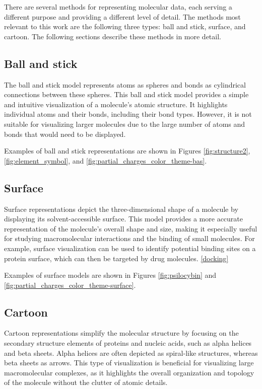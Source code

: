 \documentclass[
  digital,     %
  oneside,     %
  nosansbold,  %
  nocolorbold, %
  lof,         %
  lot,         %
]{fithesis4}
\begin{document}

There are several methods for representing molecular data, each serving a different purpose and providing a different level of detail. The methods most relevant to this work are the following three types: ball and stick, surface, and cartoon. The following sections describe these methods in more detail.

\subsection{Ball and stick}
\label{subsection:ball_and_stick}

The ball and stick model represents atoms as spheres and bonds as cylindrical connections between these spheres. This ball and stick model provides a simple and intuitive visualization of a molecule's atomic structure. It highlights individual atoms and their bonds, including their bond types. \cite{tsai2003introduction} However, it is not suitable for visualizing larger molecules due to the large number of atoms and bonds that would need to be displayed.

Examples of ball and stick representations are shown in Figures \ref{fig:structure2}, \ref{fig:element_symbol}, and \ref{fig:partial_charges_color_theme-bas}.

\subsection{Surface}
\label{subsection:surface}

Surface representations depict the three-dimensional shape of a molecule by displaying its solvent-accessible surface. This model provides a more accurate representation of the molecule's overall shape and size, making it especially useful for studying macromolecular interactions and the binding of small molecules.
For example, surface visualization can be used to identify potential binding sites on a protein surface, which can then be targeted by drug molecules. \ref{docking}

Examples of surface models are shown in Figures \ref{fig:psilocybin} and \ref{fig:partial_charges_color_theme-surface}.

\subsection{Cartoon}
\label{subsection:cartoon}

Cartoon representations simplify the molecular structure by focusing on the secondary structure elements of proteins and nucleic acids, such as alpha helices and beta sheets. Alpha helices are often depicted as spiral-like structures, whereas beta sheets as arrows. This type of visualization is beneficial for visualizing large macromolecular complexes, as it highlights the overall organization and topology of the molecule without the clutter of atomic details. \cite{gu2009structural,tsai2003introduction}
\end{document}
